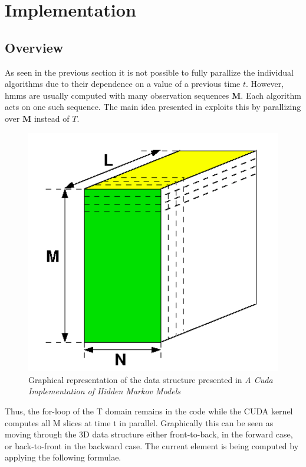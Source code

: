 \documentclass[english, paper=a4]{scrartcl}
\begin{document}
\section{Implementation}

\subsection{Overview}

As seen in the previous section it is not possible to fully parallize the individual algorithms due to their dependence on a value of a previous time \(t\). However, hmms are usually computed with many observation sequences \textbf{M}. Each algorithm acts on one such sequence. The main idea presented in \cite{cuhmm} exploits this by parallizing over \textbf{M} instead of \(T\). 

\begin{figure}[H]
\centering

\includegraphics[scale=0.3]{"3d_trellis"}
  \caption{Graphical representation of the data structure presented in \textit{A Cuda Implementation of Hidden Markov Models}\cite{cuhmm}}
\end{figure}


Thus, the for-loop of the T domain remains in the code while the CUDA kernel computes all M slices at time t in parallel. Graphically this can be seen as moving through the 3D data structure either front-to-back, in the forward case, or back-to-front in the backward case. The current element is being computed by applying the following formulae.
\end{document}
